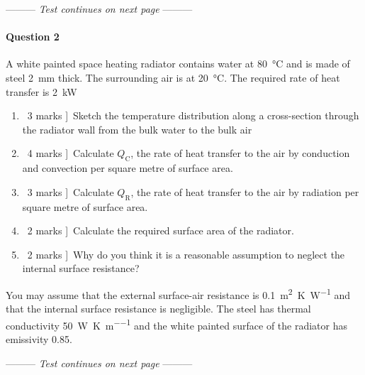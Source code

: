 \documentclass[a4paper,12pt,fleqn]{article}
\newcommand{\middlewords}{Test continues on next page}
\begin{document}
\begin{center}
\vspace{3cm}
--------- \textit{\middlewords} ---------
\end{center}


\newpage
\paragraph{\textbf{Question 2}}
A white painted space heating radiator contains water at \SI{80}{\celsius} and is made of steel \SI{2}{\milli\metre} thick. The surrounding air is at \SI{20}{\celsius}. The required rate of heat transfer is \SI{2}{\kilo\watt}

\begin{enumerate}[label=\alph*)]
\item \lbrack\ 3 marks ]\ Sketch the temperature distribution along a cross-section through the radiator wall from the bulk water to the bulk air
\item \lbrack\ 4 marks ]\ Calculate $Q_\mathrm{C}$, the rate of heat transfer to the air by conduction and  convection per square metre of surface area.
\item \lbrack\ 3 marks ]\ Calculate $Q_\mathrm{R}$,  the rate of heat transfer to the air by radiation per square metre of surface area.
\item \lbrack\ 2 marks ]\ Calculate the required surface area of the radiator.
\item \lbrack\ 2 marks ]\ Why do you think it is a reasonable assumption to neglect the internal surface resistance?
\end{enumerate}

You may assume that the external surface-air resistance is \SI{0.1} {\metre\squared\kelvin\per\watt} and that the internal surface resistance is negligible. The steel has thermal conductivity \SI{50}{\watt\per\kelvin\per\metre} and the white painted surface of the radiator has emissivity 0.85.

\begin{center}
\vspace{3cm}
--------- \textit{\middlewords} ---------
\end{center}

\newpage
\end{document}
